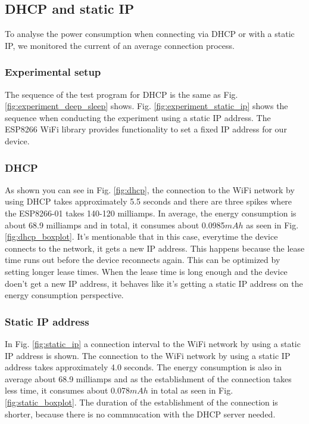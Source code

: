 \subsection{DHCP and static IP}
To analyse the power consumption when connecting via DHCP or with a static IP, we monitored the current of an average connection process.\\

\subsubsection{Experimental setup}
The sequence of the test program for DHCP is the same as Fig. \ref{fig:experiment_deep_sleep} shows.
Fig. \ref{fig:experiment_static_ip} shows the sequence when conducting the experiment using a static IP address.
The ESP8266 WiFi library provides functionality to set a fixed IP address for our device.\\

\subsubsection{DHCP}
As shown you can see in Fig. \ref{fig:dhcp}, the connection to the WiFi network by using DHCP takes approximately 5.5 seconds and there are three spikes where the ESP8266-01 takes 140-120 milliamps.
In average, the energy consumption is about 68.9 milliamps and in total, it consumes about 0.0985$mAh$ as seen in Fig. \ref{fig:dhcp_boxplot}.
It's mentionable that in this case, everytime the device connects to the network, it gets a new IP address. This happens because the lease time runs out before the device reconnects again.
This can be optimized by setting longer lease times. When the lease time is long enough and the device doen't get a new IP address, it behaves like it's getting a static IP address on the energy consumption perspective.\\

\subsubsection{Static IP address}
In Fig. \ref{fig:static_ip} a connection interval to the WiFi network by using a static IP address is shown. The connection to the WiFi network by using a static IP address takes approximately 4.0 seconds. 
The energy consumption is also in average about 68.9 milliamps and as the establishment of the connection takes less time, it consumes about 0.078$mAh$ in total as seen in Fig. \ref{fig:static_boxplot}.
The duration of the establishment of the connection is shorter, because there is no commnucation with the DHCP server needed.



